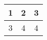 \documentclass{article}
\begin{document}
\begin{table}
    \begin{tabular}{|c|c|c|}
        \hline
        1 & 2 & 3 \\ \hline
        3 & 4 & 4 \\ \hline
    \end{tabular}
\end{table}
\end{document}
